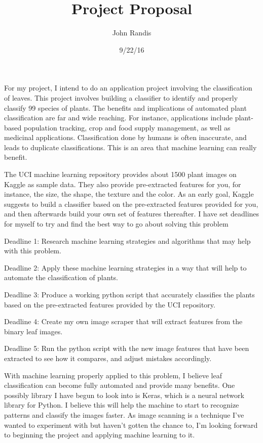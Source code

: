 \documentclass[a4paper]{article}
\title{Project Proposal}
\date{9/22/16}
\author{John Randis}
\begin{document}
\lstset{language=Python}

\maketitle

For my project, I intend to do an application project involving the classification of leaves. This project involves building a classifier to identify and properly classify 99 species of plants. The benefits and implications of automated plant classification are far and wide reaching. For instance, applications include plant-based population tracking, crop and food supply management, as well as medicinal applications. Classification done by humans is often inaccurate, and leads to duplicate classifications. This is an area that machine learning can really benefit. \par
The UCI machine learning repository provides about 1500 plant images on Kaggle as sample data. They also provide pre-extracted features for you, for instance, the size, the shape, the texture and the color. As an early goal, Kaggle suggests to build a classifier based on the pre-extracted features provided for you, and then afterwards build your own set of features thereafter. I have set deadlines for myself to try and find the best way to go about solving this problem \par \vspace{5mm}
Deadline 1: Research machine learning strategies and algorithms that may help with this problem. \par \vspace{5mm}
Deadline 2: Apply these machine learning strategies in a way that will help to automate the classification of plants.\par \vspace{5mm}
Deadline 3: Produce a working python script that accurately classifies the plants based on the pre-extracted features provided by the UCI repository.\par \vspace{5mm}
Deadline 4: Create my own image scraper that will extract features from the binary leaf images.\par \vspace{5mm}
Deadline 5: Run the python script with the new image features that have been extracted to see how it compares, and adjust mistakes accordingly. \par \vspace{5mm}
With machine learning properly applied to this problem, I believe leaf classification can become fully automated and provide many benefits. One possibly library I have begun to look into is Keras, which is a neural network library for Python. I believe this will help the machine to start to recognize patterns and classify the images faster. As image scanning is a technique I’ve wanted to experiment with but haven’t gotten the chance to, I’m looking forward to beginning the project and applying machine learning to it. 
\end{document}

